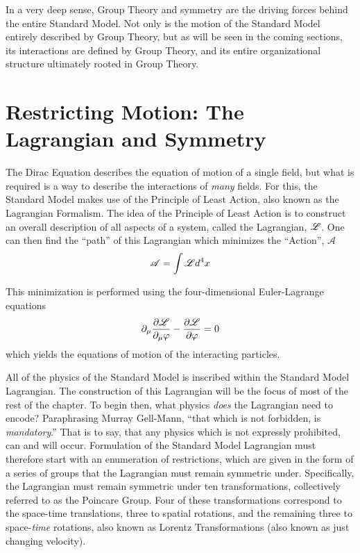     In a very deep sense, Group Theory and symmetry are the driving forces behind the entire Standard Model.
    Not only is the motion of the Standard Model entirely described by Group Theory,
        but as will be seen in the coming sections,
        its interactions are defined by Group Theory,
        and its entire organizational structure ultimately rooted in Group Theory.


\section{Restricting Motion: The Lagrangian and Symmetry}
    
    The Dirac Equation describes the equation of motion of a single field,
        but what is required is a way to describe the interactions of \textit{many} fields.
    For this, the Standard Model makes use of the Principle of Least Action,
        also known as the Lagrangian Formalism\cite{Halzen_book}.
    The idea of the Principle of Least Action is to construct an overall description of all aspects of a system,
        called the Lagrangian, $\mathscr{L}$.
    One can then find the ``path'' of this Lagrangian which minimizes the ``Action'', $\mathscr{A}$
    \begin{equation} %
        \mathscr{A} = \int \Lag d^4 x
    \end{equation}

    This minimization is performed using the four-dimensional Euler-Lagrange equations
    \begin{equation}
        \partial_\mu \frac{\partial \mathscr{L}}{\partial_\mu \varphi } - \frac{\partial \mathscr{L}}{\partial \varphi} = 0
    \end{equation}
    which yields the equations of motion of the interacting particles.

    All of the physics of the Standard Model is inscribed within the Standard Model Lagrangian.
    The construction of this Lagrangian will be the focus of most of the rest of the chapter.
    To begin then, what physics \textit{does} the Lagrangian need to encode?
    Paraphrasing Murray Gell-Mann, ``that which is not forbidden, is \textit{mandatory}.''
    That is to say, that any physics which is not expressly prohibited, can and will occur.
    Formulation of the Standard Model Lagrangian must therefore start with an enumeration of restrictions,
        which are given in the form of a series of groups that the Lagrangian must remain symmetric under.
    Specifically, the Lagrangian must remain symmetric under ten transformations,
        collectively referred to as the Poincare Group.
    Four of these transformations correspond to the space-time translations,
        three to spatial rotations, and the remaining three to space-\textit{time} rotations,
        also known as Lorentz Transformations (also known as just changing velocity).

